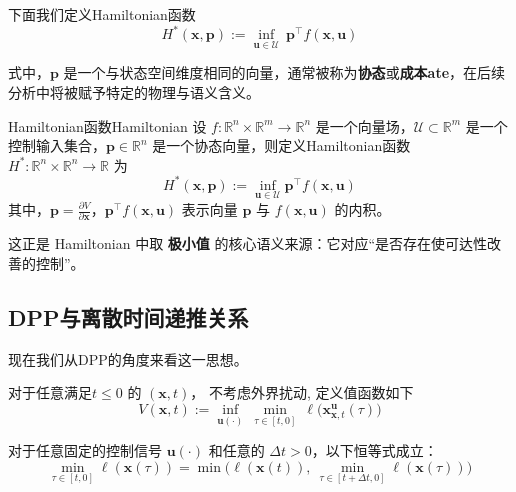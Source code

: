 \documentclass[11pt]{ctexrep}
\begin{document}
下面我们定义Hamiltonian函数
\begin{equation}\label{eq:Hamiltonian}
    H^*(\mathbf{x},\mathbf{p}):=\inf_{\mathbf{u}\in\mathcal U}\ \mathbf{p}^\top f(\mathbf{x},\mathbf{u})
\end{equation}

式中，$\mathbf{p}$ 是一个与状态空间维度相同的向量，通常被称为\textbf{协态}或\textbf{成本ate}，在后续分析中将被赋予特定的物理与语义含义。
\begin{defn}{Hamiltonian函数}{Hamiltonian}
设 $f:\mathbb{R}^n \times \mathbb{R}^m \to \mathbb{R}^n$ 是一个向量场，$\mathcal{U} \subset \mathbb{R}^m$ 是一个控制输入集合，$\mathbf{p} \in \mathbb{R}^n$ 是一个协态向量，则定义Hamiltonian函数 $H^*:\mathbb{R}^n \times \mathbb{R}^n \to \mathbb{R}$ 为
\[
H^*(\mathbf{x},\mathbf{p}) := \inf_{\mathbf{u} \in \mathcal{U}} \mathbf{p}^\top f(\mathbf{x},\mathbf{u})
\]
其中，$\mathbf{p} = \frac{\partial V}{\partial \mathbf{x}}$，$\mathbf{p}^\top f(\mathbf{x},\mathbf{u})$ 表示向量 $\mathbf{p}$ 与 $f(\mathbf{x},\mathbf{u})$ 的内积。
\end{defn}
这正是 Hamiltonian 中取 \textbf{极小值} 的核心语义来源：它对应“是否存在使可达性改善的控制”。


\subsection{DPP与离散时间递推关系}
现在我们从DPP的角度来看这一思想。

对于任意满足$t \le 0$ 的 $(\mathbf{x},t)$， 不考虑外界扰动, 定义值函数如下
\begin{equation}\label{eq:valueEqu}
    V(\mathbf{x},t):=\inf_{\mathbf{u}(\cdot)}\ \min_{\tau\in[t,0]}\ \ell\big(\mathbf{x}^{\mathbf{u}}_{\mathbf{x},t}(\tau)\big)
\end{equation}



对于任意固定的控制信号 $\mathbf{u}(\cdot)$ 和任意的 $\Delta t>0$，以下恒等式成立\cite{ref1}：
\begin{equation}\label{eq:splitMin}
    \min_{\tau\in[t,0]} \ell(\mathbf{x}(\tau))
    =
    \min\Big(\ell(\mathbf{x}(t)),\ \min_{\tau\in[t+\Delta t,0]} \ell(\mathbf{x}(\tau))\Big)
\end{equation}
\end{document}
